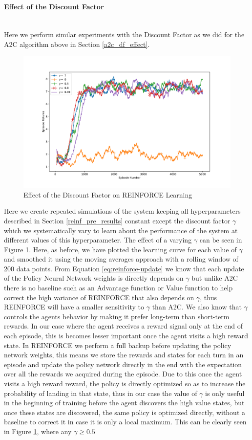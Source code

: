 \documentclass[14pt]{extarticle}
\newcommand{\myparagraph}[1]{\paragraph{#1}\mbox{}\\ \linebreak}
\numberwithin{equation}{section}
\begin{document}
\myparagraph{Effect of the Discount Factor}
Here we perform similar experiments with the Discount Factor as we did for the A2C algorithm above in Section \ref{a2c_df_effect}. 
		\begin{figure}[H]
	\hspace*{-3.25cm}   
	\centering
	\includegraphics[scale=0.8]{reinforce-dis-fact.pdf}
	\caption{Effect of the Discount Factor on REINFORCE Learning
		\label{reinforce_dis_fact}}
\end{figure}
Here we create repeated simulations of the system keeping all hyperparameters described in Section \ref{reinf_pre_results} constant except the discount factor $\gamma$ which we systematically vary to learn about the performance of the system at different values of this hyperparameter. The effect of a varying $\gamma$ can be seen in Figure \ref{reinforce_dis_fact}. Here, as before, we have plotted the learning curve for each value of $\gamma$ and smoothed it using the moving averages approach with a rolling window of 200 data points. From Equation \ref{eq:reinforce-update} we know that each update of the Policy Neural Network weights is directly depends on $\gamma$ but unlike A2C there is no baseline such as an Advantage function or Value function to help correct the high variance of REINFORCE that also depends on $\gamma$, thus REINFORCE will have a smaller sensitivity to $\gamma$ than A2C. We  also know that $\gamma$ controls the agents behavior by making it prefer long-term than short-term rewards. In our case where the agent receives a reward signal only at the end of each episode, this is becomes lesser important once the agent visits a high reward state. In REINFORCE we perform a full backup before updating the policy network weights, this means we store the rewards and states for each turn in an episode and update the policy network directly in the end with the expectation over all the rewards we acquired during the episode. Due to this once the agent visits a high reward reward, the policy is directly optimized so as to increase the probability of landing in that state, thus in our case the value of $\gamma$ is only useful in the beginning of training before the agent discovers the high value states, but once these states are discovered, the same policy is optimized directly, without a baseline to correct it in case it is only a local maximum. This can be clearly seen in Figure \ref{reinforce_dis_fact}, where any $\gamma \geq 0.5$
\end{document}
